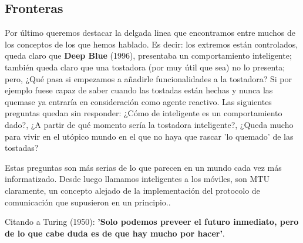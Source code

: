 \subsection{Fronteras}

Por último queremos destacar la delgada linea que encontramos entre muchos de los conceptos de los que hemos hablado. Es decir: los extremos están controlados, queda claro que \textbf{Deep Blue} (1996), presentaba un comportamiento inteligente; también queda claro que una tostadora (por muy útil que sea) no lo presenta; pero, ¿Qué pasa si empezamos a añadirle funcionalidades a la tostadora? Si por ejemplo fuese capaz de saber cuando las tostadas están hechas y nunca las quemase ya entraría en consideración como agente reactivo. Las siguientes preguntas quedan sin responder: ¿Cómo de inteligente es un comportamiento dado?, ¿A partir de qué momento sería la tostadora inteligente?, ¿Queda mucho para vivir en el utópico mundo en el que no haya que rascar 'lo quemado' de las tostadas?

\vspace{10px}

Estas preguntas son más serias de lo que parecen en un mundo cada vez más informatizado. Desde luego llamamos inteligentes a los móviles, son MTU claramente, un concepto alejado de la implementación del protocolo de comunicación que supusieron en un principio.. 

\vspace{10px}

Citando a Turing (1950): \textbf{'Solo podemos preveer el futuro inmediato, pero de lo que cabe duda es de que hay mucho por hacer'}.



\newpage
	
